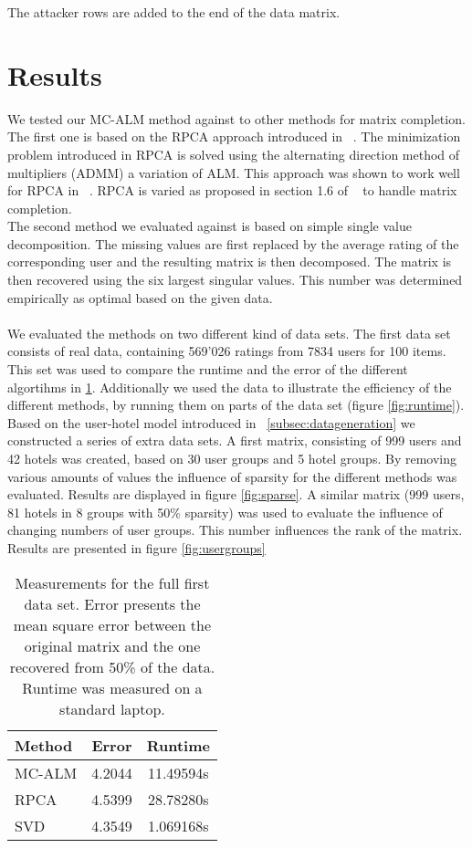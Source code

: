 \documentclass[10pt,conference,compsocconf]{IEEEtran}
\begin{document}
The attacker rows are added to the end of the data matrix.


\section{Results}
We tested our MC-ALM method against to other methods for matrix completion. The first one is based on the RPCA approach introduced in ~\cite{rpcapaper}. The minimization problem introduced in RPCA is solved using the alternating direction method of multipliers (ADMM) a variation of ALM. This approach was shown to work well for RPCA in ~\cite{rpcaalgo}. RPCA is varied as proposed in section 1.6 of ~\cite{rpcapaper} to handle matrix completion.\\
The second method we evaluated against is based on simple single value decomposition. The missing values are first replaced by the average rating of the corresponding user and the resulting matrix is then decomposed. The matrix is then recovered using the six largest singular values. This number was determined empirically as optimal based on the given data.

\paragraph{}
We evaluated the methods on two different kind of data sets. The first data set consists of real data, containing 569'026 ratings from 7834 users for 100 items. This set was used to compare the runtime and the error of the different algortihms in \ref{tab:overview}. Additionally we used the data to illustrate the efficiency of the different methods, by running them on parts of the data set (figure \ref{fig:runtime}).\\
Based on the user-hotel model introduced in ~\ref{subsec:datageneration} we constructed a series of extra data sets. A first matrix, consisting of 999 users and 42 hotels was created, based on 30 user groups and 5 hotel groups. By removing various amounts of values the influence of sparsity for the different methods was evaluated. Results are displayed in figure \ref{fig:sparse}. A similar matrix (999 users, 81 hotels in 8 groups with 50\% sparsity) was used to evaluate the influence of changing  numbers of user groups. This number influences the rank of the matrix. Results are presented in figure \ref{fig:usergroups}

\begin{table}%
\centering
\begin{tabular}{|l|c|c|}
\hline
Method & Error & Runtime\\
\hline
MC-ALM & 4.2044 & 11.49594s\\
RPCA & 4.5399 & 28.78280s\\
SVD & 4.3549 & 1.069168s\\
\hline
\end{tabular}
\caption{Measurements for the full first data set. Error presents the mean square error between the original matrix and the one recovered from 50\% of the data. Runtime was measured on a standard laptop.}
\label{tab:overview}
\end{table}
\end{document}
